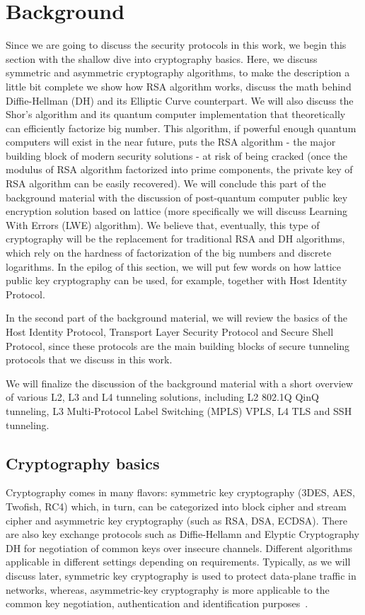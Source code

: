 \chapter{Background}

Since we are going to discuss the security protocols in this work, we begin 
this section with the shallow dive into cryptography basics. Here, we discuss 
symmetric and asymmetric cryptography algorithms, to make the description a 
little bit complete we show how RSA algorithm works, discuss the math behind 
Diffie-Hellman (DH) and its Elliptic Curve counterpart. We will also discuss 
the Shor’s algorithm and its quantum computer implementation that theoretically 
can efficiently factorize big number. This algorithm, if powerful enough quantum 
computers will exist in the near future, puts the RSA algorithm - the major 
building block of modern security solutions - at risk of being cracked (once the 
modulus of RSA algorithm factorized into prime components, the private key of RSA 
algorithm can be easily recovered). We will conclude this part of the background 
material with the discussion of post-quantum computer public key encryption 
solution based on lattice (more specifically we will discuss Learning With Errors 
(LWE) algorithm). We believe that, eventually, this type of cryptography will be 
the replacement for traditional RSA and DH algorithms, which rely on the hardness 
of factorization of the big numbers and discrete logarithms. In the epilog of this 
section, we will put few words on how lattice public key cryptography can be used, 
for example, together with Host Identity Protocol.

In the second part of the background material, we will review the basics of the Host 
Identity Protocol, Transport Layer Security Protocol and Secure Shell Protocol, since 
these protocols are the main building blocks of secure tunneling protocols that we
discuss in this work.

We will finalize the discussion of the background material with a short overview of 
various L2, L3 and L4 tunneling solutions, including L2 802.1Q QinQ tunneling, 
L3 Multi-Protocol Label Switching (MPLS) VPLS, L4 TLS and SSH tunneling.


\section{Cryptography basics}

Cryptography comes in many flavors: symmetric key cryptography 
(3DES, AES, Twofish, RC4) which, in turn, can be categorized into 
block cipher and stream cipher and asymmetric key cryptography 
(such as RSA, DSA, ECDSA). There are also key exchange protocols 
such as Diffie-Hellamn and Elyptic Cryptography DH for negotiation 
of common keys over insecure channels. Different algorithms applicable 
in different settings depending on requirements. Typically, as we will 
discuss later, symmetric key cryptography is used to protect 
data-plane traffic in networks, whereas, asymmetric-key cryptography is 
more applicable to the common key negotiation, authentication and 
identification purposes~\cite{Stinson:Cryptography}.

